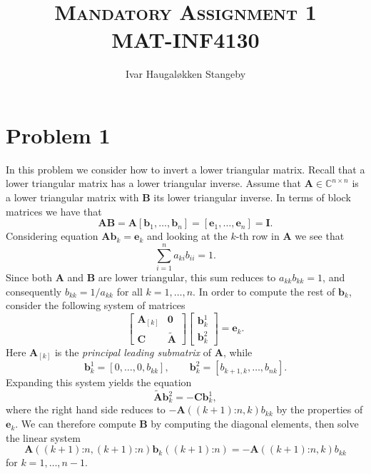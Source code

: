 \documentclass[12pt, oneside, a4paper, article]{memoir}
\title{ \textsc{Mandatory Assignment 1 \\
MAT-INF4130}}
\author{Ivar Haugal{\o}kken Stangeby}
\newcommand{\mat}[1]{\boldsymbol{#1}}
\begin{document}
    \maketitle 
       
    \chapter*{Problem 1} 

    In this problem we consider how to invert a lower triangular matrix. Recall
    that a lower triangular matrix has a lower triangular inverse. Assume that
    \( \mat{A} \in \mathbb{C}^{n\times n} \) is a lower triangular matrix with
    \( \mat{B} \) its lower triangular inverse. In terms of block matrices we
    have that
    \begin{equation}
        \mat{A}\mat{B} = \mat{A}[\mat{b}_1, \ldots, \mat{b}_n] = [\mat{e}_1,
        \ldots, \mat{e}_n] = \mat{I}.
    \end{equation}
    Considering equation \( \mat{A}\mat{b}_k = \mat{e}_k \) and looking at the
    \( k \)-th row in \( \mat{A} \) we see that
    \begin{equation}
        \sum_{i = 1}^n a_{ki}b_{ii} = 1.
    \end{equation}
    Since both \( \mat{A} \) and \( \mat{B} \) are lower triangular, this sum
    reduces to \( a_{kk}b_{kk} = 1 \), and consequently \( b_{kk} = 1 / a_{kk}
    \) for all \( k = 1, \ldots, n \).  In order to compute the rest of \(
    \mat{b}_k \), consider the following system of matrices
    \begin{equation}
        \label{eq:kthstep}
        \begin{bmatrix}
            \mat{A}_{[k]} & \mat{0} \\
            \mat{C} & \mat{\tilde{A}}
        \end{bmatrix}
        \begin{bmatrix}
            \mat{b}_k^1 \\
            \mat{b}_k^2
        \end{bmatrix}
        = 
        \mat{e}_k.
    \end{equation}
    Here \( \mat{A}_{[k]} \) is the \emph{principal leading submatrix} of \(
    \mat{A} \), while
    \begin{equation}
        \mat{b}_{k}^1 = [0, \ldots, 0, b_{kk}], \qquad \mat{b}_{k}^2 =
        [b_{k+1, k}, \ldots, b_{nk}].
    \end{equation}
    Expanding this system yields the equation
    \begin{equation}
        \mat{\tilde{A}} \mat{b}_{k}^2 = -\mat{C}\mat{b}_k^1, 
    \end{equation}
    where the right hand side reduces to \( -\mat{A}((k+1)\mathord{:}n,
    k)b_{kk} \) by the properties of \( \mat{e}_k \). We can therefore compute
    \( \mat{B} \) by computing the diagonal elements, then solve the linear
    system
    \begin{equation}
        \label{eq:linsystem}
        \mat{A}((k+1)\mathord{:}n,
        (k+1)\mathord{:}n)\mat{b}_k((k+1)\mathord{:}n) = -
        \mat{A}((k+1)\mathord{:}n, k)b_{kk}
    \end{equation}
    for \( k = 1, \ldots, n - 1\).
    
\end{document}
